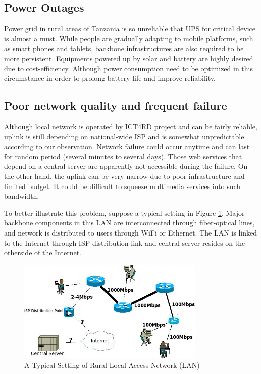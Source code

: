 \subsection{Power Outages}
Power grid in rural areas of Tanzania is so unreliable that UPS for critical device is almost a must. While people are gradually adapting to mobile platforms, such as smart phones and tablets, backbone infrastructures are also required to be more persistent. Equipments powered up by solar and battery are highly desired due to cost-efficiency. Although power consumption need to be optimized in this circumstance in order to prolong battery life and improve reliability.

\subsection{Poor network quality and frequent failure}
Although local network is operated by ICT4RD project and can be fairly reliable, uplink is still depending on national-wide ISP and is somewhat unpredictable according to our observation. Network failure could occur anytime and can last for random period (several minutes to several days). Those web services that depend on a central server are apparently not accessible during the failure. On the other hand, the uplink can be very narrow due to poor infrastructure and limited budget. It could be difficult to squeeze multimedia services into such bandwidth.

To better illustrate this problem, suppose a typical setting in Figure \ref{rural_lan}. Major backbone components in this LAN are interconnected through fiber-optical lines, and network is distributed to users through WiFi or Ethernet. The LAN is linked to the Internet through ISP distribution link and central server resides on the otherside of the Internet.

\begin{figure}
\centering
\includegraphics[width=0.8\textwidth]{../images/brief_diagram_of_sbn_network.jpeg}
\caption{A Typical Setting of Rural Local Access Network (LAN)}
\label{rural_lan}
\end{figure}

